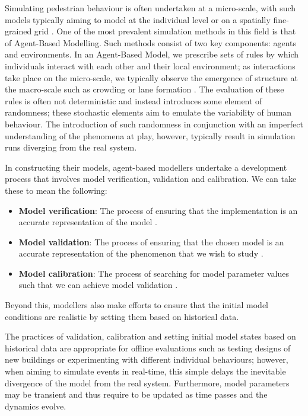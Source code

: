 \documentclass[12pt, twoside, a4paper]{article}
\begin{document}
Simulating pedestrian behaviour is often undertaken at a micro-scale, with such
models typically aiming to model at the individual level or on a spatially
fine-grained grid \citep{burstedde2001simulation}.
One of the most prevalent simulation methods in this field is that of
Agent-Based Modelling.
Such methods consist of two key components: agents and environments.
In an Agent-Based Model, we prescribe sets of rules by which individuals
interact with each other and their local environment; as interactions take
place on the micro-scale, we typically observe the emergence of structure at the
macro-scale such as crowding \citep{batty2003discrete} or lane formation
\citep{liu2014agent}.
The evaluation of these rules is often not deterministic and instead introduces
some element of randomness; these stochastic elements aim to emulate the
variability of human behaviour.
The introduction of such randomness in conjunction with an imperfect
understanding of the phenomena at play, however, typically result in simulation
runs diverging from the real system.

In constructing their models, agent-based modellers undertake a development
process that involves model verification, validation and calibration.
We can take these to mean the following:
\begin{itemize}
    \item \textbf{Model verification}: The process of ensuring that the
        implementation is an accurate representation of the model
        \citep{xiang2005verification}.
    \item \textbf{Model validation}: The process of ensuring that the chosen
        model is an accurate representation of the phenomenon that we wish to
        study \citep{crooks2008key}.
    \item \textbf{Model calibration}: The process of searching for model
        parameter values such that we can achieve model validation
        \citep{thiele2014facilitating}.
\end{itemize}
Beyond this, modellers also make efforts to ensure that the initial model
conditions are realistic by setting them based on historical data.

The practices of validation, calibration and setting initial model states based
on historical data are appropriate for offline evaluations such as testing
designs of new buildings or experimenting with different individual behaviours;
however, when aiming to simulate events in real-time, this simple delays the
inevitable divergence of the model from the real system.
Furthermore, model parameters may be transient and thus require to be updated as
time passes and the dynamics evolve.
\end{document}
